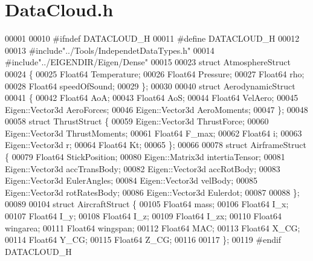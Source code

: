 \hypertarget{_data_cloud_8h_source}{}\section{Data\+Cloud.\+h}
\label{_data_cloud_8h_source}

\begin{DoxyCode}
00001 
00010 \textcolor{preprocessor}{#ifndef DATACLOUD\_H}
00011 \textcolor{preprocessor}{#define DATACLOUD\_H}
00012 
00013 \textcolor{preprocessor}{#include"../Tools/IndependetDataTypes.h"}
00014 \textcolor{preprocessor}{#include"../EIGENDIR/Eigen/Dense"}
00015 
00023 \textcolor{keyword}{struct }AtmosphereStruct
00024 \{
00025     Float64 Temperature;    
00026     Float64 Pressure;       
00027     Float64 rho;            
00028     Float64 speedOfSound;   
00029 \};
00030 
00040 \textcolor{keyword}{struct }AerodynamicStruct
00041 \{
00042     Float64 AoA;        
00043     Float64 AoS;
00044     Float64 VelAero;    
00045     Eigen::Vector3d AeroForces;
00046     Eigen::Vector3d AeroMoments;
00047 \};
00048 
00058 \textcolor{keyword}{struct }ThrustStruct \{
00059     Eigen::Vector3d ThrustForce;    
00060     Eigen::Vector3d ThrustMoments;  
00061     Float64 F\_max;                  
00062     Float64 i;                      
00063     Eigen::Vector3d r;
00064     Float64 Kt;                     
00065 \};
00066 
00078 \textcolor{keyword}{struct }AirframeStruct \{
00079     Float64 StickPosition;  
00080     Eigen::Matrix3d intertiaTensor;
00081     Eigen::Vector3d accTransBody;
00082     Eigen::Vector3d accRotBody;
00083     Eigen::Vector3d EulerAngles;
00084     Eigen::Vector3d velBody;
00085     Eigen::Vector3d rotRatesBody;
00086     Eigen::Vector3d Eulerdot;
00087 
00088 \};
00089 
00104 \textcolor{keyword}{struct }AircraftStruct \{
00105     Float64  mass;
00106     Float64  I\_x;
00107     Float64  I\_y;
00108     Float64  I\_z;
00109     Float64  I\_zx;
00110     Float64  wingarea;
00111     Float64  wingspan;
00112     Float64  MAC;
00113     Float64  X\_CG;
00114     Float64  Y\_CG;
00115     Float64  Z\_CG;
00116 
00117 \};
00119 \textcolor{preprocessor}{#endif  DATACLOUD\_H}
\end{DoxyCode}
